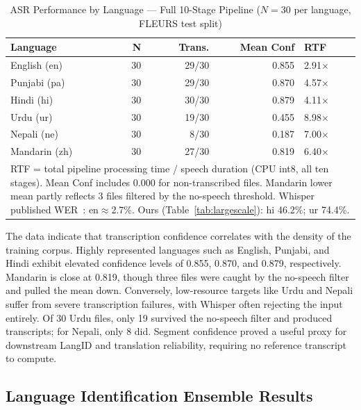 \documentclass[conference]{IEEEtran}
\begin{document}
\begin{table}[htbp]
\caption{ASR Performance by Language --- Full 10-Stage Pipeline ($N=30$ per language, FLEURS test split)}
\label{tab:asr}
\begin{center}
\begin{tabular}{lrrrl}
\toprule
\textbf{Language} & \textbf{N} & \textbf{Trans.} & \textbf{Mean Conf} & \textbf{RTF} \\
\midrule
English (en) & 30 & 29/30 & 0.855 & 2.91$\times$ \\
Punjabi (pa) & 30 & 29/30 & 0.870 & 4.57$\times$ \\
Hindi (hi)   & 30 & 30/30 & 0.879 & 4.11$\times$ \\
Urdu (ur)    & 30 & 19/30 & 0.455 & 8.98$\times$ \\
Nepali (ne)  & 30 & 8/30  & 0.187 & 7.00$\times$ \\
Mandarin (zh)& 30 & 27/30 & 0.819 & 6.40$\times$ \\
\midrule
\multicolumn{5}{p{7.5cm}}{\footnotesize RTF = total pipeline processing time / speech duration (CPU int8, all ten stages). Mean Conf includes 0.000 for non-transcribed files. Mandarin lower mean partly reflects 3 files filtered by the no-speech threshold. Whisper published WER~\cite{radford2022whisper}: en$\approx$2.7\%. Ours (Table~\ref{tab:largescale}): hi 46.2\%; ur 74.4\%.} \\
\bottomrule
\end{tabular}
\end{center}
\end{table}

The data indicate that transcription confidence correlates with the density of the training corpus. Highly represented languages such as English, Punjabi, and Hindi exhibit elevated confidence levels of 0.855, 0.870, and 0.879, respectively. Mandarin is close at 0.819, though three files were caught by the no-speech filter and pulled the mean down. Conversely, low-resource targets like Urdu and Nepali suffer from severe transcription failures, with Whisper often rejecting the input entirely. Of 30 Urdu files, only 19 survived the no-speech filter and produced transcripts; for Nepali, only 8 did. Segment confidence proved a useful proxy for downstream LangID and translation reliability, requiring no reference transcript to compute.

\subsection{Language Identification Ensemble Results}
\label{sec:langid}
\end{document}
